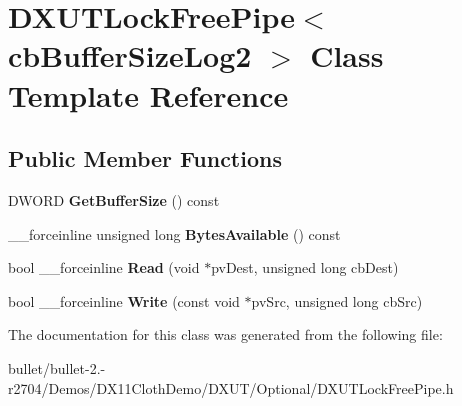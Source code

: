 \hypertarget{class_d_x_u_t_lock_free_pipe}{\section{D\+X\+U\+T\+Lock\+Free\+Pipe$<$ cb\+Buffer\+Size\+Log2 $>$ Class Template Reference}
\label{class_d_x_u_t_lock_free_pipe}
}
\subsection*{Public Member Functions}
\begin{DoxyCompactItemize}
\item 
\hypertarget{class_d_x_u_t_lock_free_pipe_ae82a3502563fc51a27c02777b1fa6a55}{D\+W\+O\+R\+D {\bfseries Get\+Buffer\+Size} () const }\label{class_d_x_u_t_lock_free_pipe_ae82a3502563fc51a27c02777b1fa6a55}

\item 
\hypertarget{class_d_x_u_t_lock_free_pipe_a50b809c740a269931057f397be4fef2a}{\+\_\+\+\_\+forceinline unsigned long {\bfseries Bytes\+Available} () const }\label{class_d_x_u_t_lock_free_pipe_a50b809c740a269931057f397be4fef2a}

\item 
\hypertarget{class_d_x_u_t_lock_free_pipe_aa732516158be7fa9bc19a7dbf653a867}{bool \+\_\+\+\_\+forceinline {\bfseries Read} (void $\ast$pv\+Dest, unsigned long cb\+Dest)}\label{class_d_x_u_t_lock_free_pipe_aa732516158be7fa9bc19a7dbf653a867}

\item 
\hypertarget{class_d_x_u_t_lock_free_pipe_a465ebf9ed3c842cbbc25fa93684387c1}{bool \+\_\+\+\_\+forceinline {\bfseries Write} (const void $\ast$pv\+Src, unsigned long cb\+Src)}\label{class_d_x_u_t_lock_free_pipe_a465ebf9ed3c842cbbc25fa93684387c1}

\end{DoxyCompactItemize}


The documentation for this class was generated from the following file\+:\begin{DoxyCompactItemize}
\item 
bullet/bullet-\/2.-\/r2704/\+Demos/\+D\+X11\+Cloth\+Demo/\+D\+X\+U\+T/\+Optional/D\+X\+U\+T\+Lock\+Free\+Pipe.\+h\end{DoxyCompactItemize}
